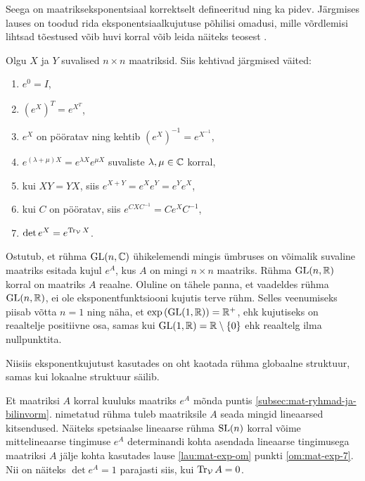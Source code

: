 Seega on maatrikseksponentsiaal korrektselt defineeritud ning ka pidev.
Järgmises lauses on toodud rida eksponentsiaalkujutuse põhilisi omadusi,
mille võrdlemisi lihtsad tõestused võib huvi korral võib leida näiteks
teosest \cite{hall2003lie}.

\begin{lau}\label{lau:mat-exp-om}
    Olgu $X$ ja $Y$ suvalised $n \times n$ maatriksid. Siis kehtivad järgmised
    väited:
    \begin{enumerate}[label=\arabic*)]
        \item\label{om:mat-exp-1} $e^0 = I$,
        \item\label{om:mat-exp-2} $\left(e^X\right)^T = e^{X^T}$,
        \item\label{om:mat-exp-3} $e^X$ on pööratav ning kehtib
            $\left(e^X\right)^{-1} = e^{X^{-1}}$,
        \item\label{om:mat-exp-4} $e^{(\lambda + \mu)X} = e^{\lambda X} e^{\mu X}$ suvaliste
            $\lambda, \mu \in \mathbb{C}$ korral,
        \item\label{om:mat-exp-5} kui $XY = YX$, siis $e^{X+Y} = e^X e^Y = e^Y e^X$,
        \item\label{om:mat-exp-6}  kui $C$ on pööratav, siis $e^{CXC^{-1}} = C e^X C^{-1}$,
        \item\label{om:mat-exp-7} $\det e^X = e^{\operatorname{Tr}_{\mathcal{V}} X}$.
    \end{enumerate}
\end{lau}

Ostutub, et rühma $\operatorname{GL}(n, \mathbb{C})$ ühikelemendi mingis ümbruses on võimalik
suvaline maatriks esitada kujul $e^A$, kus $A$ on mingi $n \times n$
maatriks. Rühma $\operatorname{GL}(n, \mathbb{R})$ korral on maatriks $A$ reaalne. Oluline on
tähele panna, et vaadeldes rühma $\operatorname{GL}(n, \mathbb{R})$, ei ole eksponentfunktsiooni
kujutis terve rühm. Selles veenumiseks piisab võtta $n = 1$ ning näha, et
$\exp \left(\operatorname{GL}(1, \mathbb{R})\right) = \mathbb{R}^+$, ehk kujutiseks on reaaltelje positiivne
osa, samas kui $\operatorname{GL}(1, \mathbb{R}) = \mathbb{R} \setminus \{0\}$ ehk reaaltelg ilma
nullpunktita.

Niisiis eksponentkujutust kasutades on oht kaotada rühma globaalne struktuur,
samas kui lokaalne struktuur säilib.

Et maatriksi $A$ korral kuuluks maatriks $e^A$ mõnda puntis
\ref{subsec:mat-ryhmad-ja-bilinvorm}.  nimetatud rühma tuleb maatriksile
$A$ seada mingid lineaarsed kitsendused. Näiteks spetsiaalse lineaarse rühma
$\operatorname{SL}(n)$ korral võime mittelineaarse tingimuse $e^A$ determinandi kohta
asendada lineaarse tingimusega maatriksi $A$ jälje kohta kasutades lause
\ref{lau:mat-exp-om} punkti \ref{om:mat-exp-7}. Nii on näiteks
$\det e^A = 1$ parajasti siis, kui $\operatorname{Tr}_{\mathcal{V}} A = 0$.

